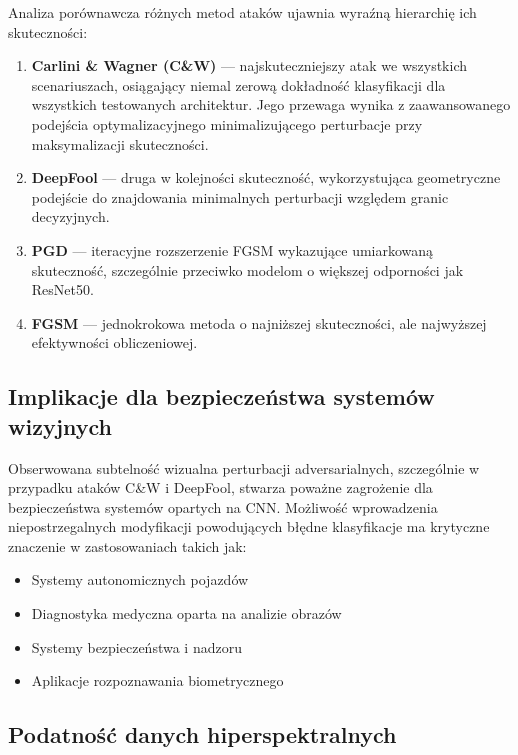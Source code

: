 \documentclass[12pt]{article}
\begin{document}
Analiza porównawcza różnych metod ataków ujawnia wyraźną hierarchię ich skuteczności:

\begin{enumerate}
    \item \textbf{Carlini \& Wagner (C\&W)} --- najskuteczniejszy atak we wszystkich scenariuszach, osiągający niemal zerową dokładność klasyfikacji dla wszystkich testowanych architektur. Jego przewaga wynika z zaawansowanego podejścia optymalizacyjnego minimalizującego perturbacje przy maksymalizacji skuteczności.
    
    \item \textbf{DeepFool} --- druga w kolejności skuteczność, wykorzystująca geometryczne podejście do znajdowania minimalnych perturbacji względem granic decyzyjnych.
    
    \item \textbf{PGD} --- iteracyjne rozszerzenie FGSM wykazujące umiarkowaną skuteczność, szczególnie przeciwko modelom o większej odporności jak ResNet50.
    
    \item \textbf{FGSM} --- jednokrokowa metoda o najniższej skuteczności, ale najwyższej efektywności obliczeniowej.
\end{enumerate}

\subsection{Implikacje dla bezpieczeństwa systemów wizyjnych}

Obserwowana subtelność wizualna perturbacji adversarialnych, szczególnie w przypadku ataków C\&W i DeepFool, stwarza poważne zagrożenie dla bezpieczeństwa systemów opartych na CNN. Możliwość wprowadzenia niepostrzegalnych modyfikacji powodujących błędne klasyfikacje ma krytyczne znaczenie w zastosowaniach takich jak:

\begin{itemize}
    \item Systemy autonomicznych pojazdów
    \item Diagnostyka medyczna oparta na analizie obrazów
    \item Systemy bezpieczeństwa i nadzoru
    \item Aplikacje rozpoznawania biometrycznego
\end{itemize}

\subsection{Podatność danych hiperspektralnych}
\end{document}

